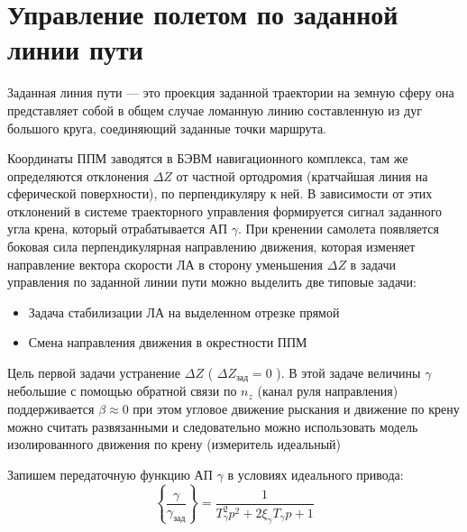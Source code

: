 \documentclass{article}
\begin{document}
\section{Управление полетом по заданной линии пути}
Заданная линия пути --- это проекция заданной траектории на земную сферу она
представляет собой в общем случае ломанную линию составленную из дуг большого
круга, соединяющий заданные точки маршрута.

\begin{figure}[ht]
	\centering
	\label{fig:fig_57}
\end{figure}

Координаты ППМ заводятся в БЭВМ навигационного комплекса, там же определяются
отклонения $ \Delta Z$ от частной ортодромия (кратчайшая линия на сферической
поверхности), по перпендикуляру к ней. В зависимости от этих отклонений в
системе траекторного управления формируется сигнал заданного угла крена,
который отрабатывается АП $\gamma$. При кренении самолета появляется боковая
сила перпендикулярная направлению движения, которая изменяет направление вектора
скорости ЛА в сторону уменьшения $\Delta Z$
в задачи управления по заданной линии пути можно выделить две типовые задачи:
\begin{itemize}
	\item Задача стабилизации ЛА на выделенном отрезке прямой
	\item Смена направления движения в окрестности ППМ
\end{itemize}
Цель первой задачи устранение $ \Delta Z$ ( $\Delta Z_\text{зад} = 0$ ). В этой
задаче величины $\gamma$ небольшие с помощью обратной связи по $n_z$ (канал
руля направления) поддерживается $\beta \approx 0$ при этом угловое движение
рыскания и движение по крену можно считать развязанными и следовательно можно
использовать модель изолированного движения по крену (измеритель идеальный)

\begin{figure}[H]
	\centering
	\label{fig:fig_58}
\end{figure}

Запишем передаточную функцию АП $\gamma$ в условиях идеального привода:
\[
	\left\{ \frac{\gamma}{\gamma_\text{зад}} \right\}  = \frac{1}{ T_\gamma^2
		p^2 + 2 \xi_\gamma T_\gamma p + 1 }
\]

\begin{figure}[H]
	\centering
	\label{fig:fig_59}
\end{figure}
\end{document}
